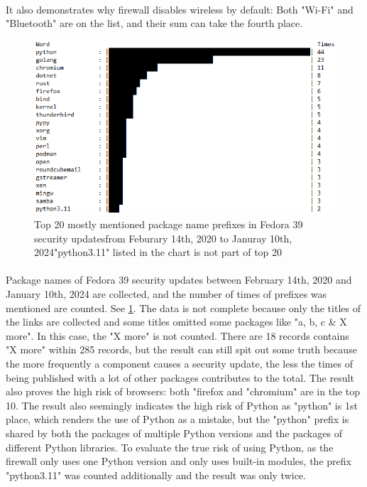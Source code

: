 \documentclass[mscthesis]{usiinfthesis}
\begin{document}
\paragraph{}
It also demonstrates why firewall disables wireless by default: Both "Wi-Fi" and "Bluetooth" are on the list, and their sum can take the fourth place.
\begin{figure}[H]
  \includegraphics[width=\textwidth]{data/fedora_39_security_updates/result.png}
  \caption{Top 20 mostly mentioned package name prefixes in Fedora 39 security updates\newline from Feburary 14th, 2020 to Januray 10th, 2024\newline "python3.11" listed in the chart is not part of top 20}
  \label{fig:fedora-sec-update}
\end{figure}
\paragraph{}
Package names of Fedora 39 security updates between February 14th, 2020 and January 10th, 2024 are collected, and the number of times of prefixes was mentioned are counted. See \cref{fig:fedora-sec-update}. The data is not complete because only the titles of the links are collected and some titles omitted some packages like "a, b, c \& X more". In this case, the "X more" is not counted. There are 18 records contains "X more" within 285 records, but the result can still spit out some truth because the more frequently a component causes a security update, the less the times of being published with a lot of other packages contributes to the total. The result also proves the high risk of browsers: both "firefox and "chromium" are in the top 10. The result also seemingly indicates the high risk of Python as "python" is 1st place, which renders the use of Python as a mistake, but the "python" prefix is shared by both the packages of multiple Python versions and the packages of different Python libraries. To evaluate the true risk of using Python, as the firewall only uses one Python version and only uses built-in modules, the prefix "python3.11" was counted additionally and the result was only twice.
\end{document}

